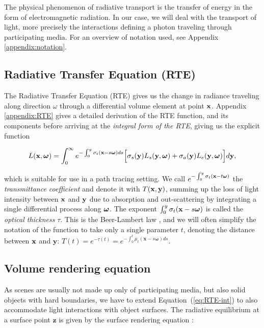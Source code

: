 The physical phenomenon of radiative transport is the transfer of energy
in the form of electromagnetic radiation. In our case, we will deal with the transport of 
light, more precisely the interactions defining a photon traveling through participating media. For an overview of notation used, see Appendix \ref{appendix:notation}.

\subsection{Radiative Transfer Equation (RTE)}

The Radiative Transfer Equation (RTE) gives us the change in radiance traveling along direction $\omega$ through a differential volume element at point $\textbf{x}$. 
Appendix \ref{appendix:RTE} gives a detailed derivation of the RTE function, and its components before arriving at the \textit{integral form of the RTE}, giving us the explicit function

\begin{equation} \label{eq:RTE-int}
L(\textbf{x}, \boldsymbol{\omega}) = \int_0^\infty 
e^{-\int_0^y{\sigma_t(\textbf{x}-s\boldsymbol{\omega})}ds}
\Big[
    \sigma_s(\textbf{y})L_s(\textbf{y}, \boldsymbol{\omega}) + \sigma_a(\textbf{y})L_e(\textbf{y}, \boldsymbol{\omega})
\Big]
d\textbf{y},
\end{equation}

which is suitable for use in a path tracing setting.
We call $e^{-\int_0^y{\sigma_t(\textbf{x}-t\boldsymbol{\omega})}}$ the  
\textit{transmittance coefficient} and denote it with $T(\textbf{x}, \textbf{y})$,
summing up the loss of light intensity between $\textbf{x}$ and 
$\textbf{y}$ due to absorption and out-scattering by integrating a single differential 
process along $\boldsymbol{\omega}$. The exponent
$\int_0^y{\sigma_t(\textbf{x}-s\boldsymbol{\omega})}$ 
is called the \textit{optical thickness} $\tau$. This is the Beer-Lambert law \cite{Lambert}, and we will often simplify the notation of the
function to take only a single parameter $t$, denoting the distance between $\textbf{x}$ and
$\textbf{y}$: $T(t) = e^{-\tau(t)} =e^{-\int_0^t{\mu_t(\boldsymbol{x}-s\boldsymbol\omega)}ds}$.

\subsection{Volume rendering equation}
As scenes are usually not made up only of participating media, but also solid objects
with hard boundaries, we have to extend Equation~(\ref{eq:RTE-int}) to also 
accommodate light interactions with object surfaces. The radiative equilibrium at a surface point $\textbf{z}$ is given by the surface rendering equation \cite{Kaj86}:

